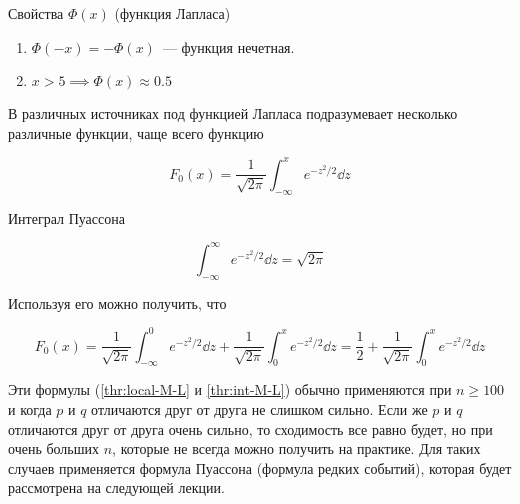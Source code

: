 \begin{remark}
  Свойства \(\Phi(x)\) (функция Лапласа)

  \begin{enumerate}
  \item
    \(\Phi(-x) = -\Phi(x)\)~--- функция нечетная.

  \item
    \(x > 5 \implies \Phi(x) \approx 0.5\)
  \end{enumerate}
\end{remark}

\begin{remark}
  В различных источниках под функцией Лапласа подразумевает несколько различные
  функции, чаще всего функцию

  \begin{equation*}
    F_0 (x) = \frac{1}{\sqrt{2 \pi}} \int_{-\infty}^x e^{-z^2 / 2} \dd z
  \end{equation*}
\end{remark}

\begin{remark}
  Интеграл Пуассона
  
  \begin{equation*}
    \int_{-\infty}^{\infty} e^{-z^2 / 2} \dd z = \sqrt{2 \pi}
  \end{equation*}

  Используя его можно получить, что

  \begin{equation*}
    F_0 (x)
    = \frac{1}{\sqrt{2 \pi}} \int_{-\infty}^0 e^{-z^2 / 2} \dd z
      + \frac{1}{\sqrt{2 \pi}} \int_0^x e^{-z^2 / 2} \dd z
    = \frac{1}{2} + \frac{1}{\sqrt{2 \pi}} \int_0^x e^{-z^2 / 2} \dd z
  \end{equation*}
\end{remark}

\begin{remark}
  Эти формулы (\ref{thr:local-M-L} и \ref{thr:int-M-L}) обычно применяются при
  \(n \ge 100\) и когда \(p\) и \(q\) отличаются друг от друга не слишком
  сильно. Если же \(p\) и \(q\) отличаются друг от друга очень сильно, то
  сходимость все равно будет, но при очень больших \(n\), которые не всегда
  можно получить на практике. Для таких случаев применяется формула Пуассона
  (формула редких событий), которая будет рассмотрена на следующей лекции.
\end{remark}

